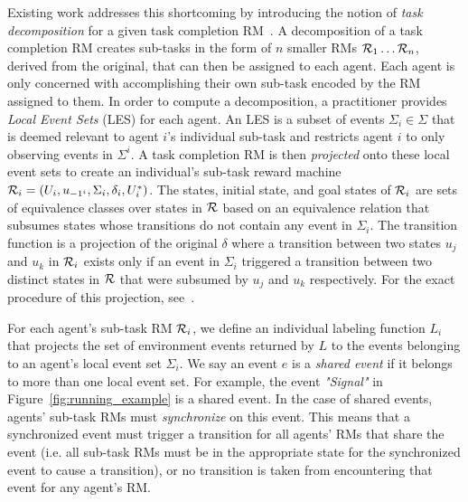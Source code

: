 Existing work addresses this shortcoming by introducing the notion of \textit{task decomposition} for a given task completion RM~\cite{neary2020reward}. A decomposition of a task completion RM creates sub-tasks in the form of $n$ smaller RMs $\mathcal{R}_1 \dots \mathcal{R}_n$, derived from the original, that can then be assigned to each agent. Each agent is only concerned with accomplishing their own sub-task encoded by the RM assigned to them. In order to compute a decomposition, a practitioner provides \textit{Local Event Sets} (LES) for each agent. An LES is a subset of events $\Sigma_i \in \Sigma$ that is deemed relevant to agent $i$'s individual sub-task and restricts agent $i$ to only observing events in $\Sigma^i$. A task completion RM is then \textit{projected} onto these local event sets to create an individual's sub-task reward machine $\mathcal{R}_i = (U_i, u_{-1^i}, \Sigma_i, \delta_i, U^*_i)$. The states, initial state, and goal states of $\mathcal{R}_i$ are sets of equivalence classes over states in $\mathcal{R}$ based on an equivalence relation that subsumes states whose transitions do not contain any event in $\Sigma_i$. The transition function is a projection of the original $\delta$ where a transition between two states $u_j$ and $u_k$ in $\mathcal{R}_i$ exists only if an event in $\Sigma_i$ triggered a transition between two distinct states in $\mathcal{R}$ that were subsumed by $u_j$ and $u_k$ respectively. For the exact procedure of this projection, see~\cite{neary2020reward}. 

For each agent's sub-task RM $\mathcal{R}_i$, we define an individual labeling function $L_i$ that projects the set of environment events returned by $L$ to the events belonging to an agent's local event set $\Sigma_i$. We say an event $e$ is a \textit{shared event} if it belongs to more than one local event set. For example, the event \textit{"Signal"} in Figure~\ref{fig:running_example} is a shared event. In the case of shared events, agents' sub-task RMs must \textit{synchronize} on this event. This means that a synchronized event must trigger a transition for all agents' RMs that share the event (i.e. all sub-task RMs must be in the appropriate state for the synchronized event to cause a transition), or no transition is taken from encountering that event for any agent's RM. 

